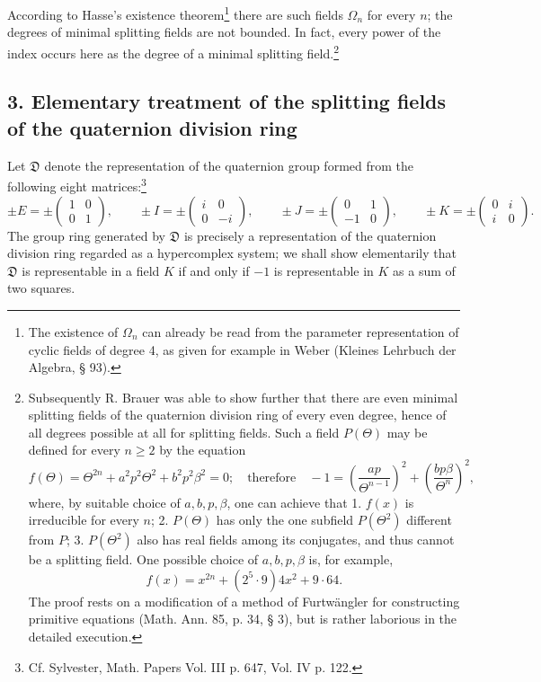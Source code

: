 \documentclass[11pt]{article}
\newcommand{\mat}[1]{\begin{pmatrix}#1\end{pmatrix}}
\begin{document}
According to Hasse's existence theorem\footnote{The existence of $\Omega_n$ can already be read from the parameter representation of cyclic fields of degree 4, as given for example in Weber (Kleines Lehrbuch der Algebra, § 93).} there are such fields $\Omega_n$ for every $n$; the degrees of minimal splitting fields are not bounded. In fact, every power of the index occurs here as the degree of a minimal splitting field.\footnote{Subsequently R. Brauer was able to show further that there are even minimal splitting fields of the quaternion division ring of every even degree, hence of all degrees possible at all for splitting fields. Such a field $P(\Theta)$ may be defined for every $n\ge2$ by the equation
\[
 f(\Theta)=\Theta^{2n}+a^2p^2\Theta^2+b^2p^2\beta^2=0;
 \quad \text{therefore}\quad -1=\left(\frac{ap}{\Theta^{n-1}}\right)^2+
       \left(\frac{bp\beta}{\Theta^n}\right)^2,
\]
where, by suitable choice of $a,b,p,\beta$, one can achieve that 1. $f(x)$ is irreducible for every $n$; 2. $P(\Theta)$ has only the one subfield $P(\Theta^2)$ different from $P$; 3. $P(\Theta^2)$ also has real fields among its conjugates, and thus cannot be a splitting field. One possible choice of $a,b,p,\beta$ is, for example,
\[
        f(x)=x^{2n}+(2^5\cdot9)4x^2+9\cdot64.
\]
The proof rests on a modification of a method of Furtwängler for constructing primitive equations (Math. Ann. 85, p. 34, § 3), but is rather laborious in the detailed execution.}

\subsection*{3. Elementary treatment of the splitting fields of the quaternion division ring}

Let $\mathfrak{D}$ denote the representation of the quaternion group formed from the following eight matrices:\footnote{Cf. Sylvester, Math. Papers Vol. III p. 647, Vol. IV p. 122.}
\[
\pm E=\pm\mat{1&0\\0&1},\qquad
\pm I=\pm\mat{i&0\\0&-i},\qquad
\pm J=\pm\mat{0&1\\-1&0},\qquad
\pm K=\pm\mat{0&i\\ i&0}.
\]
The group ring generated by $\mathfrak{D}$ is precisely a representation of the quaternion division ring regarded as a hypercomplex system; we shall show elementarily that $\mathfrak{D}$ is representable in a field $K$ if and only if $-1$ is representable in $K$ as a sum of two squares.
\end{document}

